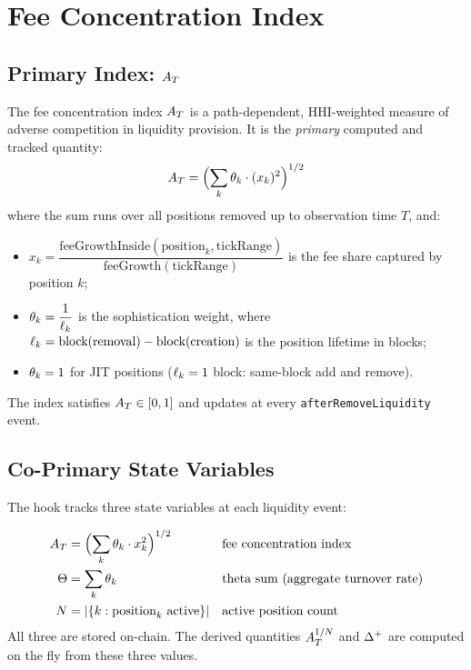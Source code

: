 
\section{Fee Concentration Index}\label{sec:fee-concentration-index}

\subsection{Primary Index: $A_T$}

The fee concentration index $A_T$ is a path-dependent, HHI-weighted measure of adverse competition
in liquidity provision. It is the \emph{primary} computed and tracked quantity:
\begin{equation}\label{eq:concentration-index}
  A_T = \Bigl(\sum_{k} \theta_k \cdot (x_k)^2 \Bigr)^{1/2}
\end{equation}
where the sum runs over all positions removed up to observation time $T$, and:
\begin{itemize}
  \item $x_k = \dfrac{\text{feeGrowthInside}(\text{position}_k, \text{tickRange})}%
                     {\text{feeGrowth}(\text{tickRange})}$
        is the fee share captured by position $k$;
  \item $\theta_k = \dfrac{1}{\ell_k}$
        is the sophistication weight, where $\ell_k = \text{block}(\text{removal}) - \text{block}(\text{creation})$
        is the position lifetime in blocks;
  \item $\theta_k = 1$ for JIT positions ($\ell_k = 1$ block: same-block add and remove).
\end{itemize}

The index satisfies $A_T \in [0,1]$ and updates at every \texttt{afterRemoveLiquidity} event.

\subsection{Co-Primary State Variables}

The hook tracks three state variables at each liquidity event:

\begin{definition}\label{def:co-primary}
\begin{align}
  A_T &= \Bigl(\sum_{k} \theta_k \cdot x_k^2 \Bigr)^{1/2}
    && \text{fee concentration index} \label{eq:at-state}\\
  \Theta &= \sum_{k} \theta_k
    && \text{theta sum (aggregate turnover rate)} \label{eq:theta-state}\\
  N &= |\{k : \text{position}_k \text{ active}\}|
    && \text{active position count} \label{eq:n-state}
\end{align}
All three are stored on-chain. The derived quantities $A_T^{1/N}$ and $\Delta^{+}$
are computed on the fly from these three values.
\end{definition}

